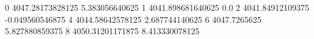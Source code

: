 0 4047.28173828125 5.383056640625
1 4041.898681640625 0.0
2 4041.84912109375 -0.049560546875
4 4044.58642578125 2.687744140625
6 4047.7265625 5.827880859375
8 4050.31201171875 8.413330078125
